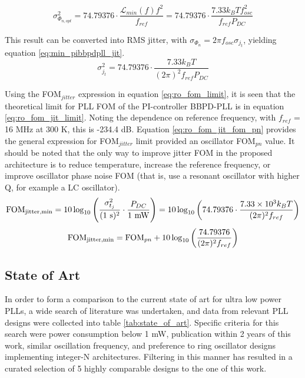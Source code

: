 	\begin{equation}\label{eq:min_pibbpdpll_pn}
		\sigma_{\Phi_{n,opt}}^2 = 74.79376\cdot \frac{\mathcal{L}_{min}(f)f^2}{f_{ref}} = 74.79376\cdot  \frac{7.33 k_B T f_{osc}^2}{f_{ref}P_{DC}}
	\end{equation}

	 This result can be converted into RMS jitter, with $\sigma_{\Phi_{n}} = 2\pi f_{osc}\sigma_{j_t}$, yielding equation \ref{eq:min_pibbpdpll_jit}.
	\begin{equation}\label{eq:min_pibbpdpll_jit}
		\sigma_{j_t}^2 = 74.79376\cdot  \frac{7.33 k_B T}{(2\pi)^2f_{ref}P_{DC}}
	\end{equation}


	  Using the FOM$_{jitter}$ expression in equation \ref{eq:ro_fom_limit}, it is seen that the theoretical limit for PLL FOM of the PI-controller BBPD-PLL is in equation \ref{eq:ro_fom_jit_limit}. Noting the dependence on reference frequency, with $f_{ref}$ = 16 MHz at 300 K, this is -234.4 dB. Equation \ref{eq:ro_fom_jit_fom_pn} provides the general expression for FOM$_{jitter}$ limit provided an oscillator FOM$_{pn}$ value. It should be noted that the only way to improve jitter FOM in the proposed architecture is to reduce temperature, increase the reference frequency, or improve oscillator phase noise FOM (that is, use a resonant oscillator with higher Q, for example a LC oscillator).
	\begin{equation}\label{eq:ro_fom_jit_limit}
		\textnormal{FOM}_{\textnormal{jitter,min}} = 10\log_{10}\left(\frac{\sigma_{t_j}^2}{(\textnormal{1 s})^2}\cdot\frac{P_{DC}}{\textnormal{1 mW}}\right) =  10\log_{10}\left( 74.79376\cdot  \frac{7.33\times 10^3 k_B T}{(2\pi)^2f_{ref}} \right)
	\end{equation}
	\begin{equation}\label{eq:ro_fom_jit_fom_pn}
		\textnormal{FOM}_{\textnormal{jitter,min}} = \textnormal{FOM}_{pn} + 10\log_{10}\left(\frac{74.79376}{(2\pi)^2 f_{ref}} \right)
	\end{equation}

\subsection{State of Art}

In order to form a comparison to the current state of art for ultra low power PLLs, a wide search of literature was undertaken, and data from relevant PLL designs were collected into table \ref{tab:state_of_art}. Specific criteria for this search were power consumption below 1 mW, publication within 2 years of this work, similar oscillation frequency, and preference to ring oscillator designs implementing integer-N architectures. Filtering in this manner has resulted in a curated selection of 5 highly comparable designs to the one of this work.

